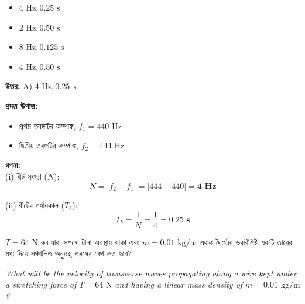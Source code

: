 \documentclass[12pt, a4paper]{article}
\begin{document}
\begin{itemize}[label={}, leftmargin=1cm, itemsep=0.5em]
    \item[\textbf{A)}] $4\text{ Hz}, 0.25\text{ s}$
    \item[\textbf{B)}] $2\text{ Hz}, 0.50\text{ s}$
    \item[\textbf{C)}] $8\text{ Hz}, 0.125\text{ s}$
    \item[\textbf{D)}] $4\text{ Hz}, 0.50\text{ s}$
\end{itemize}

\vspace{0.5em}
\begin{tcolorbox}[answerbox]
    \textbf{\color{success} উত্তর:} A) $4\text{ Hz}, 0.25\text{ s}$
\end{tcolorbox}
\vspace{1em}

\begin{tcolorbox}[solutionbox={সমাধান (Solution)}]
    \noindent
    \textbf{প্রদত্ত উপাত্ত:}
    \begin{itemize}[leftmargin=1.5em, itemsep=0.2em]
        \item প্রথম তরঙ্গটির কম্পাঙ্ক, $f_1 = 440\text{ Hz}$
        \item দ্বিতীয় তরঙ্গটির কম্পাঙ্ক, $f_2 = 444\text{ Hz}$
    \end{itemize}

    \vspace{0.6em}
    \noindent\textbf{গণনা:} \\
    (i) বীট সংখ্যা ($N$):
    \[ N = |f_2 - f_1| = |444 - 440| = \mathbf{4\text{ Hz}} \]
    
    (ii) বীটের পর্যায়কাল ($T_b$):
    \[ T_b = \frac{1}{N} = \frac{1}{4} = \mathbf{0.25\text{ s}} \]
\end{tcolorbox}


\begin{tcolorbox}[questionbox={প্রশ্ন (Question) 10}]
    \noindent
    $T = 64\text{ N}$ বল দ্বারা সশব্দে টানা অবস্থায় থাকা এবং $m = 0.01\text{ kg/m}$ একক দৈর্ঘ্যের ভরবিশিষ্ট একটি তারের মধ্য দিয়ে সঞ্চালিত অনুপ্রস্থ তরঙ্গের বেগ কত হবে?
    
    \vspace{0.8em}
    \begin{english}
    \noindent\textit{\color{darkgray}
    What will be the velocity of transverse waves propagating along a wire kept under a stretching force of $T = 64\text{ N}$ and having a linear mass density of $m = 0.01\text{ kg/m}$?
    }
    \end{english}
\end{tcolorbox}
\end{document}
